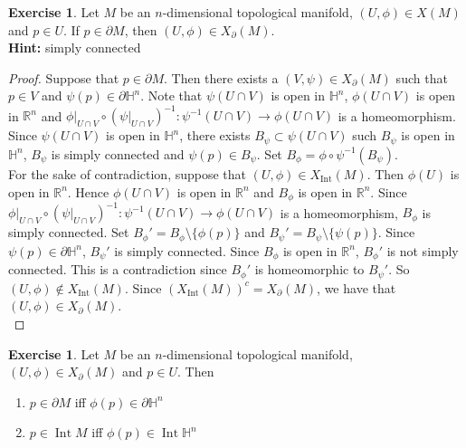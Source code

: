 \documentclass{book}
\theoremstyle{definition}
\newtheorem{ex}[definition]{Exercise}
\renewcommand{\H}{\mathbb{H}}
\newcommand{\R}{\mathbb{R}}
\DeclareMathOperator{\Int}{Int}
\DeclareMathOperator*{\0}{\mbf{0}}
\DeclareMathOperator*{\1}{\mbf{1}}
\newcommand{\tbf}[1]{\textbf{#1}}
\newcommand{\p}{\partial}
\begin{document}
	\begin{ex}
		Let $M$ be an $n$-dimensional topological manifold, $(U, \phi) \in X(M)$ and $p \in U$. If $p \in \partial M$, then $(U, \phi) \in X_{\p}(M)$. \\
		\tbf{Hint:} simply connected
	\end{ex}

	\begin{proof}
		Suppose that $p \in \partial M$. Then there exists a $(V, \psi) \in X_{\p}(M)$ such that $p \in V$ and $\psi(p) \in \partial \H^n$. Note that $\psi(U \cap V)$ is open in $\H^n$, $\phi(U \cap V)$ is open in $\R^n$ and $\phi|_{U \cap V} \circ (\psi|_{U \cap V})^{-1}: \psi^{-1}(U \cap V) \rightarrow \phi(U \cap V)$ is a homeomorphism. \\
		Since $\psi(U \cap V)$ is open in $\H^n$, there exists $B_{\psi} \subset \psi(U \cap V)$ such $B_{\psi}$ is open in $\H^n$, $B_{\psi}$ is simply connected and $\psi(p) \in B_{\psi}$. Set $B_{\phi} = \phi \circ \psi^{-1}(B_{\psi})$. \\
		For the sake of contradiction, suppose that $(U, \phi) \in X_{\Int}(M)$. Then $\phi(U)$ is open in $\R^n$. Hence $\phi(U \cap V)$ is open in $\R^n$ and $B_{\phi}$ is open in $\R^n$. Since $\phi|_{U \cap V} \circ (\psi|_{U \cap V})^{-1}: \psi^{-1}(U \cap V) \rightarrow \phi(U \cap V)$ is a homeomorphism, $B_{\phi}$ is simply connected. Set $B_{\phi}' = B_{\phi} \setminus \{\phi(p)\}$ and $B_{\psi}' = B_{\psi} \setminus \{\psi(p)\}$. Since $\psi(p) \in \p \H^n$, $B_{\psi}'$ is simply connected. Since $B_{\phi}$ is open in $\R^n$, $B_{\phi}'$ is not simply connected. This is a contradiction since $B_{\phi}'$ is homeomorphic to $B_{\psi}'$. So $(U, \phi) \not \in X_{\Int}(M)$. Since $(X_{\Int}(M))^c = X_{\p}(M)$, we have that $(U, \phi) \in X_{\p}(M)$.\\
	\end{proof}

	\begin{ex}
		Let $M$ be an $n$-dimensional topological manifold, $(U, \phi) \in X_{\p}(M)$ and $p \in U$. Then 
		\begin{enumerate}
			\item $p \in \p M$ iff $\phi(p) \in \p \H^n$
			\item $p \in \Int M$ iff $\phi(p) \in \Int \H^n$
		\end{enumerate}
	\end{ex}
\end{document}
